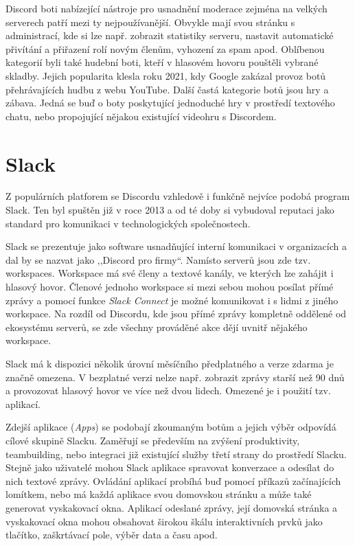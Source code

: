 \documentclass[FM]{tulthesis}
\begin{document}
	Discord boti nabízející nástroje pro usnadnění moderace zejména na velkých serverech patří mezi ty nejpoužívanější. Obvykle mají svou stránku s administrací, kde si lze např. zobrazit statistiky serveru, nastavit automatické přivítání a přiřazení rolí novým členům, vyhození za spam apod. Oblíbenou kategorií byli také hudební boti, kteří v hlasovém hovoru pouštěli vybrané skladby. Jejich popularita klesla roku 2021, kdy Google zakázal provoz botů přehrávajících hudbu z webu \mbox{YouTube}. Další častá kategorie botů jsou hry a zábava. Jedná se buď o boty poskytující jednoduché hry v prostředí textového chatu, nebo propojující nějakou existující videohru s Discordem.
	
	\section{Slack}
	
	Z populárních platforem se Discordu vzhledově i funkčně nejvíce podobá program Slack. Ten byl spuštěn již v roce 2013 a od té doby si vybudoval reputaci jako standard pro komunikaci v technologických společnostech. \cite{lit_Discord}
	
	Slack se prezentuje jako software usnadňující interní komunikaci v organizacích a dal by se nazvat jako ,,Discord pro firmy``. Namísto serverů jsou zde tzv. workspaces. Workspace má své členy a textové kanály, ve kterých lze zahájit i hlasový hovor. Členové jednoho workspace si mezi sebou mohou posílat přímé zprávy a pomocí funkce \textit{Slack Connect} je možné komunikovat i s lidmi z jiného workspace. Na rozdíl od Discordu, kde jsou přímé zprávy kompletně oddělené od ekosystému serverů, se zde všechny prováděné akce dějí uvnitř nějakého workspace.
	
	Slack má k dispozici několik úrovní měsíčního předplatného a verze zdarma je značně omezena. V bezplatné verzi nelze např. zobrazit zprávy starší než 90 dnů a provozovat hlasový hovor ve více než dvou lidech. Omezené je i použití tzv. aplikací.
	
	Zdejší aplikace (\textit{Apps}) se podobají zkoumaným botům a jejich výběr odpovídá cílové skupině Slacku. Zaměřují se především na zvýšení produktivity, \mbox{teambuilding}, nebo integraci již existující služby třetí strany do prostředí Slacku. Stejně jako uživatelé mohou Slack aplikace spravovat konverzace a odesílat do nich textové zprávy. Ovládání aplikací probíhá buď pomocí příkazů začínajících lomítkem, nebo má každá aplikace svou domovskou stránku a může také generovat vyskakovací okna. Aplikací odeslané zprávy, její domovská stránka a vyskakovací okna mohou obsahovat širokou škálu interaktivních prvků jako tlačítko, zaškrtávací pole, výběr data a času apod.
	
\end{document}

